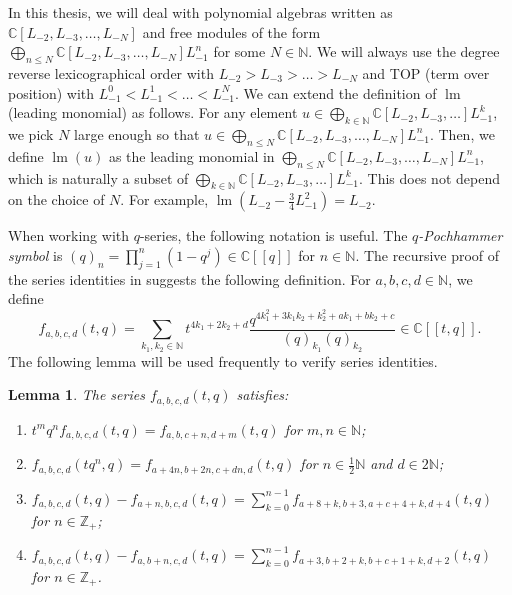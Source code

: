\documentclass[a4paper, 12pt, reqno]{amsart}
\newtheorem{lemma}[theorem]{Lemma}
\theoremstyle{remark}
\numberwithin{equation}{subsection}
\DeclareMathOperator{\lm}{lm}
\begin{document}
In this thesis, we will deal with polynomial algebras written as $\mathbb{C}[L_{-2}, L_{-3}, \dots, L_{-N}]$ and free modules of the form $\bigoplus_{n \le N}\mathbb{C}[L_{-2}, L_{-3}, \dots, L_{-N}]L_{-1}^n$ for some $N \in \mathbb{N}$.
We will always use the degree reverse lexicographical order with $L_{-2} > L_{-3} > \dots > L_{-N}$ and TOP (term over position) with $L_{-1}^0 < L_{-1}^1 < \dots < L_{-1}^N$.
We can extend the definition of $\lm$ (leading monomial) as follows.
For any element $u \in \bigoplus_{k \in \mathbb{N}}\mathbb{C}[L_{-2}, L_{-3}, \dots]L_{-1}^k$, we pick $N$ large enough so that $u \in \bigoplus_{n \le N}\mathbb{C}[L_{-2}, L_{-3}, \dots, L_{-N}]L_{-1}^n$.
Then, we define $\lm(u)$ as the leading monomial in $\bigoplus_{n \le N}\mathbb{C}[L_{-2}, L_{-3}, \dots, L_{-N}]L_{-1}^n$, which is naturally a subset of $\bigoplus_{k \in \mathbb{N}}\mathbb{C}[L_{-2}, L_{-3}, \dots]L_{-1}^k$.
This does not depend on the choice of $N$.
For example, $\lm(L_{-2} - \frac{3}{4}L_{-1}^2) = L_{-2}$.

When working with $q$-series, the following notation is useful.
The \emph{$q$-Pochhammer symbol} is $(q)_n = \prod_{j = 1}^n(1 - q^j) \in \mathbb{C}[[q]]$ for $n \in \mathbb{N}$.
The recursive proof of the series identities in \cite{andrews_singular_2022} suggests the following definition.
For $a, b, c, d \in \mathbb{N}$, we define
\begin{equation*}
  f_{a, b, c, d}(t, q) = \sum_{k_1, k_2 \in \mathbb{N}}t^{4k_1 + 2k_2 + d}\frac{q^{4k_1^2 + 3k_1k_2 + k_2^2 + ak_1 + bk_2 + c}}{(q)_{k_1}(q)_{k_2}} \in \mathbb{C}[[t, q]].
\end{equation*}
The following lemma will be used frequently to verify series identities.

\begin{lemma}
  \label{lmm:25}
  The series $f_{a, b, c, d}(t, q)$ satisfies:
  \begin{enumerate}
  \item $t^mq^nf_{a, b, c, d}(t, q) = f_{a, b, c + n, d + m}(t, q)$ for $m, n \in \mathbb{N}$;
  \item $f_{a, b, c, d}(tq^n, q) = f_{a + 4n, b + 2n, c + dn, d}(t, q)$ for $n \in \frac{1}{2}\mathbb{N}$ and $d \in 2\mathbb{N}$;
  \item $f_{a, b, c, d}(t, q) - f_{a + n, b, c, d}(t, q) = \sum_{k = 0}^{n - 1}f_{a + 8 + k, b + 3, a + c + 4 + k, d + 4}(t, q)$ for $n \in \mathbb{Z}_+$;
  \item $f_{a, b, c, d}(t, q) - f_{a, b + n, c, d}(t, q) = \sum_{k = 0}^{n - 1}f_{a + 3, b + 2 + k, b + c + 1 + k, d + 2}(t, q)$ for $n \in \mathbb{Z}_+$.
  \end{enumerate}
\end{lemma}
\end{document}
